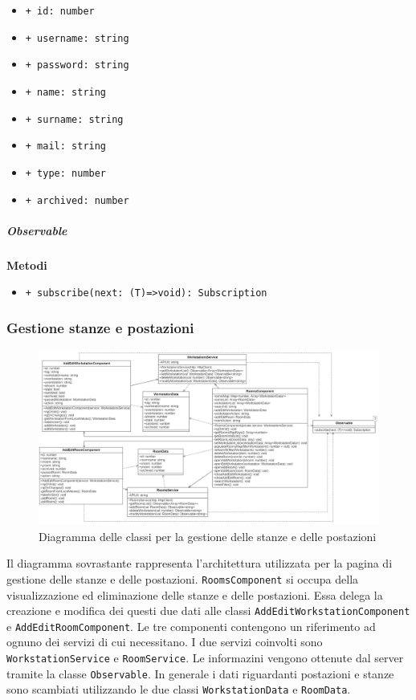\begin{itemize}
	\item \texttt{+ id: number}
	\item \texttt{+ username: string}
	\item \texttt{+ password: string}
	\item \texttt{+ name: string}
	\item \texttt{+ surname: string}
	\item \texttt{+ mail: string}
	\item \texttt{+ type: number}
	\item \texttt{+ archived: number}
\end{itemize}
\subparagraph{Observable}
\textbf{Metodi}
\begin{itemize}
	\item \texttt{+ subscribe(next: (T)=>void): Subscription}
\end{itemize}

\subsubsection{Gestione stanze e postazioni}
\begin{figure}[H]
	\centering
	\includegraphics[width=18cm]{res/images/webapp-visualAddEditStanzePostazioni-diagrammaClassi.png}
	\caption{Diagramma delle classi per la gestione delle stanze e delle postazioni}
	\label{fig:DiagrammaClassiStanzePostazioni}
\end{figure}
Il diagramma sovrastante rappresenta l'architettura utilizzata per la pagina di gestione delle stanze e delle postazioni. \newline
\texttt{RoomsComponent} si occupa della visualizzazione ed eliminazione delle stanze e delle postazioni. Essa delega la creazione e modifica dei questi due dati alle classi \texttt{AddEditWorkstationComponent} e \texttt{AddEditRoomComponent}. Le tre componenti contengono un riferimento ad ognuno dei servizi di cui necessitano. I due servizi coinvolti sono \texttt{WorkstationService} e \texttt{RoomService}. Le informazini vengono ottenute dal server tramite la classe \texttt{Observable}. In generale i dati riguardanti postazioni e stanze sono scambiati utilizzando le due classi \texttt{WorkstationData} e \texttt{RoomData}.


